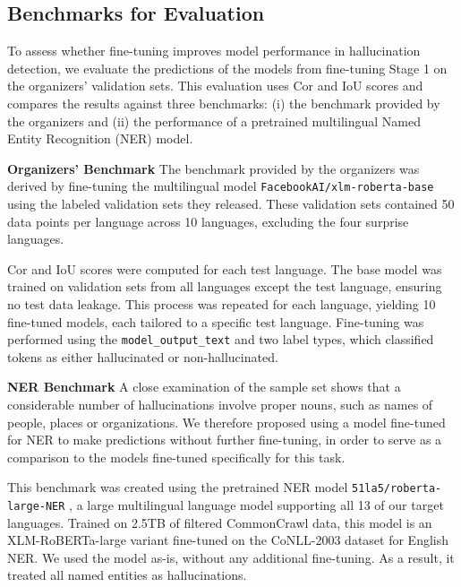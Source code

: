 \documentclass[11pt]{article}
\begin{document}
\subsection{Benchmarks for Evaluation}
To assess whether fine-tuning improves model performance in hallucination detection, we evaluate the predictions of the models from fine-tuning Stage 1 on the organizers' validation sets. This evaluation uses Cor and IoU scores and compares the results against three benchmarks: (i) the benchmark provided by the organizers and (ii) the performance of a pretrained multilingual Named Entity Recognition (NER) model. 

\textbf{Organizers' Benchmark}
The benchmark provided by the organizers was derived by fine-tuning the multilingual model \texttt{FacebookAI/xlm-roberta-base} \cite{DBLP:journals/corr/abs-1911-02116} using the labeled validation sets they released. These validation sets contained 50 data points per language across 10 languages, excluding the four surprise languages.

Cor and IoU scores were computed for each test language. The base model was trained on validation sets from all languages except the test language, ensuring no test data leakage. This process was repeated for each language, yielding 10 fine-tuned models, each tailored to a specific test language. Fine-tuning was performed using the \texttt{model\_output\_text} and two label types, which classified tokens as either hallucinated or non-hallucinated.



\textbf{NER Benchmark}
A close examination of the sample set shows that a considerable number of hallucinations involve proper nouns, such as names of people, places or organizations. We therefore proposed using a model fine-tuned for NER to make predictions without further fine-tuning, in order to serve as a comparison to the models fine-tuned specifically for this task.

This benchmark was created using the pretrained NER model \texttt{51la5/roberta-large-NER} \cite{conneau2019unsupervised}, a large multilingual language model supporting all 13 of our target languages. Trained on 2.5TB of filtered CommonCrawl data, this model is an XLM-RoBERTa-large variant fine-tuned on the CoNLL-2003 dataset for English NER. We used the model as-is, without any additional fine-tuning. As a result, it treated all named entities as hallucinations.
\end{document}
